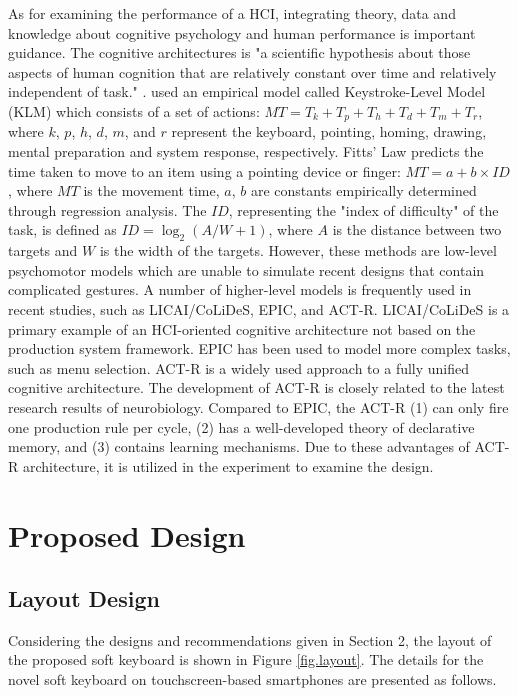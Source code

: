 \documentclass{singlecol-new}
\theoremstyle{TH}{
\newtheorem{lemma}{Lemma}
\newtheorem{theorem}[lemma]{Theorem}
\newtheorem{corrolary}[lemma]{Corrolary}
\newtheorem{conjecture}[lemma]{Conjecture}
\newtheorem{proposition}[lemma]{Proposition}
\newtheorem{claim}[lemma]{Claim}
\newtheorem{stheorem}[lemma]{Wrong Theorem}
\newtheorem{algorithm}{Algorithm}
}
\theoremstyle{THrm}{
\newtheorem{definition}{Definition}[section]
\newtheorem{question}{Question}[section]
\newtheorem{remark}{Remark}
\newtheorem{scheme}{Scheme}
}
\theoremstyle{THhit}{
\newtheorem{case}{Case}[section]
}
\begin{document}
As for examining the performance of a HCI, integrating theory, data and knowledge about cognitive psychology and human performance is important guidance. The cognitive architectures is "a scientific hypothesis about those aspects of human cognition that are relatively constant over time and relatively independent of task." \citep{gray1997introduction}. \citet{card1983psychology} used an empirical model called Keystroke-Level Model (KLM) which consists of a set of actions: $MT=T_k+T_p+T_h+T_d+T_m+T_r$, where $k$, $p$, $h$, $d$, $m$, and $r$ represent the keyboard, pointing, homing, drawing, mental preparation and system response, respectively. Fitts' Law \citep{fitts1954information} predicts the time taken to move to an item using a pointing device or finger: $MT=a+b\times ID$, where $MT$ is the movement time, $a$, $b$ are constants empirically determined through regression analysis. The $ID$, representing the "index of difficulty" of the task, is defined as $ID=\log_2(A/W+1)$, where $A$ is the distance between two targets and $W$ is the width of the targets. However, these methods are low-level psychomotor models which are unable to simulate recent designs that contain complicated gestures. A number of higher-level models is frequently used in recent studies, such as LICAI/CoLiDeS, EPIC, and ACT-R. LICAI/CoLiDeS \citep{kitajima1997comprehension} is a primary example of an HCI-oriented cognitive architecture not based on the production system framework. EPIC \citep{kieras1997overview} has been used to model more complex tasks, such as menu selection. ACT-R \citep{anderson2004integrated}is a widely used approach to a fully unified cognitive architecture. The development of ACT-R is closely related to the latest research results of neurobiology. Compared to EPIC, the ACT-R (1) can only fire one production rule per cycle, (2) has a well-developed theory of declarative memory, and (3) contains learning mechanisms. Due to these advantages of ACT-R architecture, it is utilized in the experiment to examine the design.

\section{Proposed Design}

\subsection{Layout Design}

Considering the designs and recommendations given in Section 2, the layout of the proposed soft keyboard is shown in Figure \ref{fig.layout}. The details for the novel soft keyboard on touchscreen-based smartphones are presented as follows. \\
\end{document}
